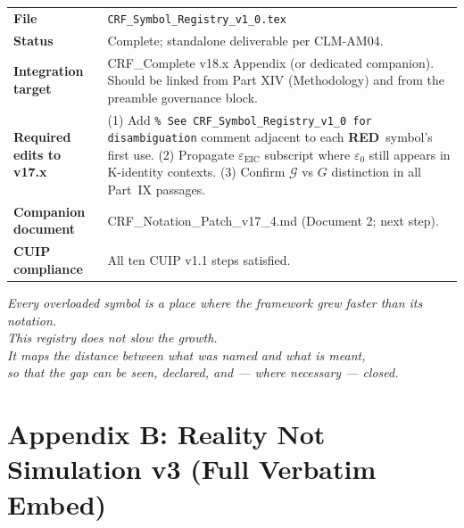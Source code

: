 \documentclass[12pt, a4paper]{article}
\newcommand{\TRED}{\textcolor{redframe}{\textbf{RED}}}
\begin{document}
\begin{center}
\small
\renewcommand{\arraystretch}{1.35}
\begin{tabular}{p{3.5cm} p{10cm}}
\toprule
\textbf{File} &
\texttt{CRF\_Symbol\_Registry\_v1\_0.tex}\\
\textbf{Status} &
Complete; standalone deliverable per CLM-AM04.\\
\textbf{Integration target} &
CRF\_Complete v18.x Appendix (or dedicated companion).
Should be linked from Part XIV (Methodology) and from the
preamble governance block.\\
\textbf{Required edits to v17.x} &
(1) Add \texttt{\% See CRF\_Symbol\_Registry\_v1\_0 for disambiguation}
comment adjacent to each \TRED\ symbol's first use.
(2) Propagate $\varepsilon_{\text{EIC}}$ subscript where
$\varepsilon_0$ still appears in K-identity contexts.
(3) Confirm $\mathcal{G}$ vs $G$ distinction in all Part~IX passages.\\
\textbf{Companion document} &
CRF\_Notation\_Patch\_v17\_4.md (Document 2; next step).\\
\textbf{CUIP compliance} &
All ten CUIP v1.1 steps satisfied.\\
\bottomrule
\end{tabular}
\end{center}

\bigskip
\begin{center}
\textit{Every overloaded symbol is a place where the framework
grew faster than its notation.\\
This registry does not slow the growth.\\
It maps the distance between what was named and what is meant,\\
so that the gap can be seen, declared, and --- where necessary
--- closed.}
\end{center}

\bigskip



\section{Appendix B: Reality Not Simulation v3 (Full Verbatim Embed)}
\label{app:reality}
\end{document}
